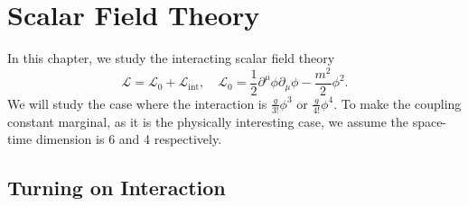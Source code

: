\chapter{Scalar Field Theory}

In this chapter, we study the interacting scalar field theory
\begin{equation}
	\mathcal L = \mathcal L_0 + \mathcal L_{\mathrm{int}}, \quad
	\mathcal L_0 =\frac{1}{2}\partial^\mu \phi \partial_\mu \phi -\frac{m^2}{2}\phi^2.
\end{equation}
We will study the case where the interaction is $\frac{g}{3!}\phi^3$ or $\frac{g}{4!}\phi^4$.
To make the coupling constant marginal, as it is the physically interesting case, we assume the space-time dimension is 6 and 4 respectively.




\section{Turning on Interaction}
